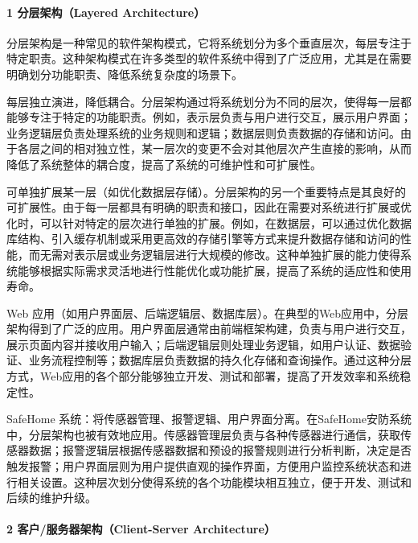 \hypertarget{ux5206ux5c42ux67b6ux6784layered-architecture}{%
\paragraph{1 分层架构（Layered Architecture）}\label{ux5206ux5c42ux67b6ux6784layered-architecture}}

分层架构是一种常见的软件架构模式，它将系统划分为多个垂直层次，每层专注于特定职责。这种架构模式在许多类型的软件系统中得到了广泛应用，尤其是在需要明确划分功能职责、降低系统复杂度的场景下。


每层独立演进，降低耦合。分层架构通过将系统划分为不同的层次，使得每一层都能够专注于特定的功能职责。例如，表示层负责与用户进行交互，展示用户界面；业务逻辑层负责处理系统的业务规则和逻辑；数据层则负责数据的存储和访问。由于各层之间的相对独立性，某一层次的变更不会对其他层次产生直接的影响，从而降低了系统整体的耦合度，提高了系统的可维护性和可扩展性。

可单独扩展某一层（如优化数据层存储）。分层架构的另一个重要特点是其良好的可扩展性。由于每一层都具有明确的职责和接口，因此在需要对系统进行扩展或优化时，可以针对特定的层次进行单独的扩展。例如，在数据层，可以通过优化数据库结构、引入缓存机制或采用更高效的存储引擎等方式来提升数据存储和访问的性能，而无需对表示层或业务逻辑层进行大规模的修改。这种单独扩展的能力使得系统能够根据实际需求灵活地进行性能优化或功能扩展，提高了系统的适应性和使用寿命。


Web 应用（如用户界面层、后端逻辑层、数据库层）。在典型的Web应用中，分层架构得到了广泛的应用。用户界面层通常由前端框架构建，负责与用户进行交互，展示页面内容并接收用户输入；后端逻辑层则处理业务逻辑，如用户认证、数据验证、业务流程控制等；数据库层负责数据的持久化存储和查询操作。通过这种分层方式，Web应用的各个部分能够独立开发、测试和部署，提高了开发效率和系统稳定性。

SafeHome 系统：将传感器管理、报警逻辑、用户界面分离。在SafeHome安防系统中，分层架构也被有效地应用。传感器管理层负责与各种传感器进行通信，获取传感器数据；报警逻辑层根据传感器数据和预设的报警规则进行分析判断，决定是否触发报警；用户界面层则为用户提供直观的操作界面，方便用户监控系统状态和进行相关设置。这种层次划分使得系统的各个功能模块相互独立，便于开发、测试和后续的维护升级。

\hypertarget{ux5ba2ux6237ux670dux52a1ux5668ux67b6ux6784client-server-architecture}{%
\paragraph{2 客户/服务器架构（Client-Server Architecture）}\label{ux5ba2ux6237ux670dux52a1ux5668ux67b6ux6784client-server-architecture}}

